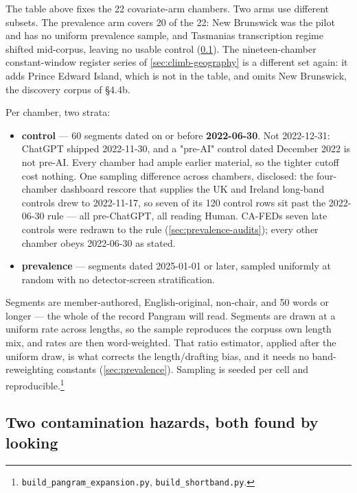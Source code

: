 The table above fixes the 22 covariate-arm chambers. Two arms use different
subsets. The prevalence arm covers 20 of the 22: New Brunswick was the pilot
and has no uniform prevalence sample, and Tasmania\textquotesingle s transcription regime
shifted mid-corpus, leaving no usable control (\cref{sec:hazards}). The nineteen-chamber
constant-window register series of \cref{sec:climb-geography} is a different set again: it adds
Prince Edward Island, which is not in the table, and omits New Brunswick, the
discovery corpus of §4.4b.

Per chamber, two strata:

\begin{itemize}
\tightlist
\item
  \textbf{control} --- 60 segments dated on or before \textbf{2022-06-30}. Not
  2022-12-31: ChatGPT shipped 2022-11-30, and a "pre-AI" control dated
  December 2022 is not pre-AI. Every chamber had ample earlier material, so
  the tighter cutoff cost nothing. One sampling difference across chambers,
  disclosed: the four-chamber dashboard rescore that supplies the UK and
  Ireland long-band controls drew to 2022-11-17, so seven of its 120 control
  rows sit past the 2022-06-30 rule --- all pre-ChatGPT, all reading Human.
  CA-FED\textquotesingle s seven late controls were redrawn to the rule (\cref{sec:prevalence-audits});
  every other chamber obeys 2022-06-30 as stated.
\item
  \textbf{prevalence} --- segments dated 2025-01-01 or later, sampled uniformly at
  random with no detector-screen stratification.
\end{itemize}

Segments are member-authored, English-original, non-chair, and 50 words or
longer --- the whole of the record Pangram\cite{pangram2024} will read. Segments are drawn at a
uniform rate across lengths, so the sample reproduces the corpus\textquotesingle s own length
mix, and rates are then word-weighted. That ratio estimator, applied after the
uniform draw, is what corrects the length/drafting bias, and it needs no
band-reweighting constants (\cref{sec:prevalence}). Sampling is seeded per cell and
reproducible.\footnote{\texttt{build\_\allowbreak{}pangram\_\allowbreak{}expansion.\allowbreak{}py}, \texttt{build\_shortband.py}.}

\subsection{Two contamination hazards, both found by looking}\label{sec:hazards}

